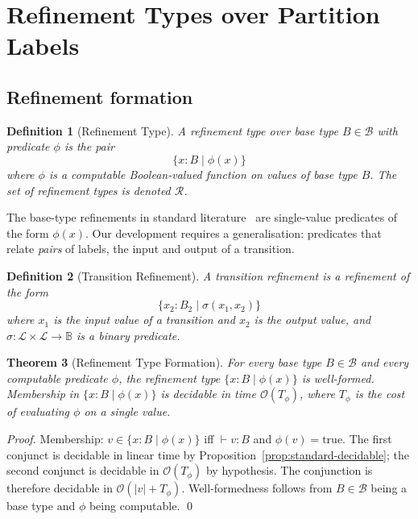 \documentclass[twocolumn,11pt,a4paper]{article}
\newtheorem{theorem}{Theorem}[section]
\newtheorem{definition}[theorem]{Definition}
\newcommand{\Bool}{\mathbb{B}}
\newcommand{\Lab}{\mathcal{L}}
\newcommand{\Sel}{\sigma}
\begin{document}
\section{Refinement Types over Partition Labels}
\label{sec:refinement-types}

\subsection{Refinement formation}

\begin{definition}[Refinement Type]
\label{def:refinement-type}
A \emph{refinement type} over base type $B \in \mathcal{B}$ with predicate $\phi$ is the pair
\[
\{x : B \mid \phi(x)\}
\]
where $\phi$ is a computable Boolean-valued function on values of base type $B$. The set of refinement types is denoted $\mathcal{R}$.
\end{definition}

The base-type refinements in standard literature~\citep{rondon2008liquid,vazou2014refinement} are single-value predicates of the form $\phi(x)$. Our development requires a generalisation: predicates that relate \emph{pairs} of labels, the input and output of a transition.

\begin{definition}[Transition Refinement]
\label{def:transition-refinement}
A \emph{transition refinement} is a refinement of the form
\[
\{x_2 : B_2 \mid \Sel(x_1, x_2)\}
\]
where $x_1$ is the input value of a transition and $x_2$ is the output value, and $\Sel : \Lab \times \Lab \to \Bool$ is a binary predicate.
\end{definition}

\begin{theorem}[Refinement Type Formation]
\label{thm:refinement-formation}
For every base type $B \in \mathcal{B}$ and every computable predicate $\phi$, the refinement type $\{x : B \mid \phi(x)\}$ is well-formed. Membership in $\{x : B \mid \phi(x)\}$ is decidable in time $\mathcal{O}(T_\phi)$, where $T_\phi$ is the cost of evaluating $\phi$ on a single value.
\end{theorem}

\begin{proof}
Membership: $v \in \{x : B \mid \phi(x)\}$ iff $\vdash v : B$ and $\phi(v) = \mathrm{true}$. The first conjunct is decidable in linear time by Proposition~\ref{prop:standard-decidable}; the second conjunct is decidable in $\mathcal{O}(T_\phi)$ by hypothesis. The conjunction is therefore decidable in $\mathcal{O}(|v| + T_\phi)$. Well-formedness follows from $B \in \mathcal{B}$ being a base type and $\phi$ being computable. \qed
\end{proof}
\end{document}

